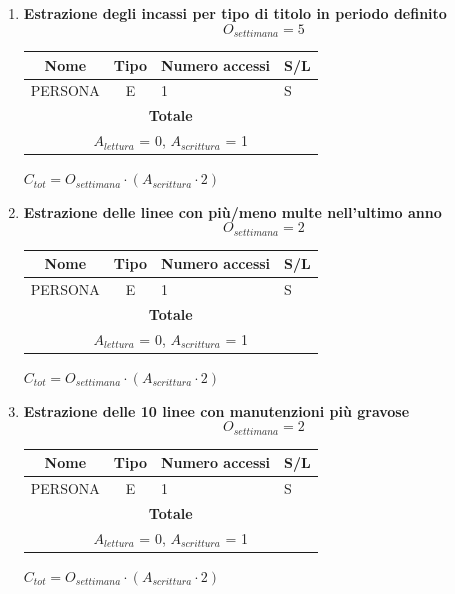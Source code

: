 \documentclass[12pt,a4paper]{report}
\begin{document}
\begin{enumerate}[label=\textbf{\arabic*)}]
    \item \textbf{Estrazione degli incassi per tipo di titolo in periodo definito} \\
    \[ {O_{settimana} = 5} \]
    \begin{table}[H]
    \centering
    \begin{tabular}{|c|c|l|l|}
    \hline
    \textbf{Nome} & \textbf{Tipo} & \textbf{Numero accessi} & \textbf{S/L} \\
    \hline
    PERSONA & E & 1 & S \\
    \hline
    \multicolumn{4}{c}{\textbf{Totale}} \\    
    \multicolumn{4}{c}{${A_{lettura}}$ = 0, ${A_{scrittura}}$ = 1} \\
    \hline
    \end{tabular}
    \end{table}
    \begin{center}
    ${C_{tot} = {O_{settimana}}\cdot({A_{scrittura}}\cdot 2)}$
    \end{center}

    \item \textbf{Estrazione delle linee con più/meno multe nell’ultimo anno} \\
    \[ {O_{settimana} = 2} \]
    \begin{table}[H]
    \centering
    \begin{tabular}{|c|c|l|l|}
    \hline
    \textbf{Nome} & \textbf{Tipo} & \textbf{Numero accessi} & \textbf{S/L} \\
    \hline
    PERSONA & E & 1 & S \\
    \hline
    \multicolumn{4}{c}{\textbf{Totale}} \\    
    \multicolumn{4}{c}{${A_{lettura}}$ = 0, ${A_{scrittura}}$ = 1} \\
    \hline
    \end{tabular}
    \end{table}
    \begin{center}
    ${C_{tot} = {O_{settimana}}\cdot({A_{scrittura}}\cdot 2)}$
    \end{center}

    \item \textbf{Estrazione delle 10 linee con manutenzioni più gravose} \\
    \[ {O_{settimana} = 2} \]
    \begin{table}[H]
    \centering
    \begin{tabular}{|c|c|l|l|}
    \hline
    \textbf{Nome} & \textbf{Tipo} & \textbf{Numero accessi} & \textbf{S/L} \\
    \hline
    PERSONA & E & 1 & S \\
    \hline
    \multicolumn{4}{c}{\textbf{Totale}} \\    
    \multicolumn{4}{c}{${A_{lettura}}$ = 0, ${A_{scrittura}}$ = 1} \\
    \hline
    \end{tabular}
    \end{table}
    \begin{center}
    ${C_{tot} = {O_{settimana}}\cdot({A_{scrittura}}\cdot 2)}$
    \end{center}


\end{enumerate}
\end{document}

